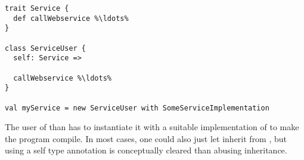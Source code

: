 \begin{lstlisting}
trait Service {
  def callWebservice %\ldots%
}

class ServiceUser {
  self: Service =>

  callWebservice %\ldots%
}

val myService = new ServiceUser with SomeServiceImplementation
\end{lstlisting}

The user of  than has to instantiate it with a suitable implementation of  to make the program compile. In most cases, one could also just let  inherit from , but using a self type annotation is conceptually cleared than abusing inheritance.
